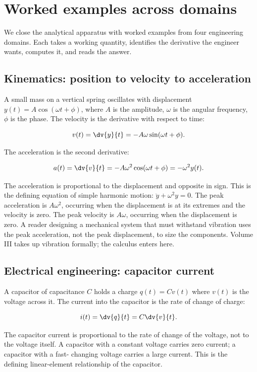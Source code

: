 \section{Worked examples across domains}

We close the analytical apparatus with worked examples from four
engineering domains. Each takes a working quantity, identifies the
derivative the engineer wants, computes it, and reads the answer.

\subsection{Kinematics: position to velocity to acceleration}

A small mass on a vertical spring oscillates with displacement
$y(t) = A \cos(\omega t + \phi)$, where $A$ is the amplitude,
$\omega$ is the angular frequency, $\phi$ is the phase. The
velocity is the derivative with respect to time:

\[
v(t) = \dv{y}{t} = -A \omega \sin(\omega t + \phi).
\]

The acceleration is the second derivative:

\[
a(t) = \dv{v}{t} = -A \omega^{2} \cos(\omega t + \phi) =
-\omega^{2} y(t).
\]

The acceleration is proportional to the displacement and opposite
in sign. This is the defining equation of simple harmonic motion:
$\ddot{y} + \omega^{2} y = 0$. The peak acceleration is $A
\omega^{2}$, occurring when the displacement is at its extremes
and the velocity is zero. The peak velocity is $A \omega$,
occurring when the displacement is zero. A reader designing a
mechanical system that must withstand vibration uses the peak
acceleration, not the peak displacement, to size the components.
Volume III takes up vibration formally; the calculus enters here.

\subsection{Electrical engineering: capacitor current}

A capacitor of capacitance $C$ holds a charge $q(t) = C v(t)$
where $v(t)$ is the voltage across it. The current into the
capacitor is the rate of change of charge:

\[
i(t) = \dv{q}{t} = C \dv{v}{t}.
\]

The capacitor current is proportional to the rate of change of
the voltage, not to the voltage itself. A capacitor with a
constant voltage carries zero current; a capacitor with a fast-
changing voltage carries a large current. This is the defining
linear-element relationship of the capacitor.

